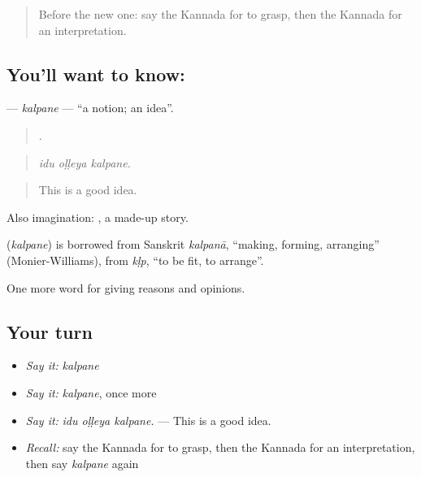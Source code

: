 \label{lesson:KA-C384-kalpane}



\begin{quote}
Before the new one: say the Kannada for to grasp, then the Kannada for an interpretation.
\end{quote}

\subsection*{You'll want to know: }
\textbf{} — \emph{kalpane} — \textquotedblleft{}a notion; an idea\textquotedblright{}.

\begin{quote}
  .
\end{quote}

\begin{quote}
\emph{idu oḷḷeya kalpane.}
\end{quote}

\begin{quote}
This is a good idea.
\end{quote}

Also imagination:  , a made-up story.

\begin{cousinweb}
\textbf{} (\emph{kalpane}) is borrowed from Sanskrit \emph{kalpanā}, \textquotedblleft{}making, forming, arranging\textquotedblright{} (Monier-Williams), from \emph{kḷp}, \textquotedblleft{}to be fit, to arrange\textquotedblright{}.
\end{cousinweb}

\begin{grammarlens}[title={What you've built}]
One more word for giving reasons and opinions.
\end{grammarlens}

\subsection*{Your turn}
\begin{itemize}
\raggedright
  \item \emph{Say it:} \emph{kalpane}
  \item \emph{Say it:} \emph{kalpane}, once more
  \item \emph{Say it:} \emph{idu oḷḷeya kalpane.} — This is a good idea.
  \item \emph{Recall:} say the Kannada for to grasp, then the Kannada for an interpretation, then say \emph{kalpane} again
\end{itemize}

